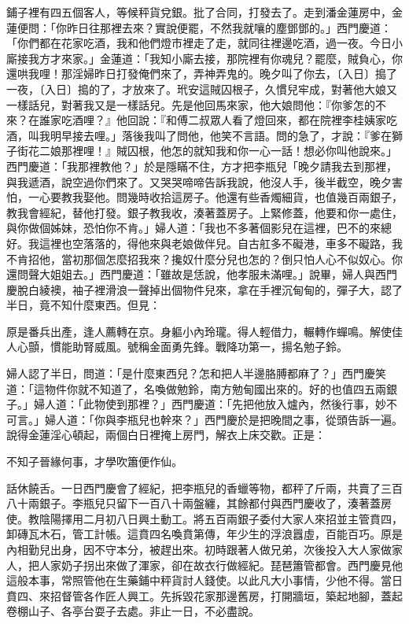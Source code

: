鋪子裡有四五個客人，等候秤貨兌銀。批了合同，打發去了。走到潘金蓮房中，金蓮便問：「你昨日往那裡去來？實說便罷，不然我就嚷的塵鄧鄧的。」西門慶道： 「你們都在花家吃酒，我和他們燈市裡走了走，就同往裡邊吃酒，過一夜。今日小廝接我方才來家。」金蓮道：「我知小廝去接，那院裡有你魂兒？罷麼，賊負心，你還哄我哩！那淫婦昨日打發俺們來了，弄神弄鬼的。晚夕叫了你去，〔入日〕搗了一夜，〔入日〕搗的了，才放來了。玳安這賊囚根子，久慣兒牢成，對著他大娘又一樣話兒，對著我又是一樣話兒。先是他回馬來家，他大娘問他：『你爹怎的不來？在誰家吃酒哩？』他回說：『和傅二叔眾人看了燈回來，都在院裡李桂姨家吃酒，叫我明早接去哩。」落後我叫了問他，他笑不言語。問的急了，才說：『爹在獅子街花二娘那裡哩！』賊囚根，他怎的就知我和你一心一話！想必你叫他說來。」西門慶道：「我那裡教他？」於是隱瞞不住，方才把李瓶兒「晚夕請我去到那裡，與我遞酒，說空過你們來了。又哭哭啼啼告訴我說，他沒人手，後半截空，晚夕害怕，一心要教我娶他。問幾時收拾這房子。他還有些香燭細貨，也值幾百兩銀子，教我會經紀，替他打發。銀子教我收，湊著蓋房子。上緊修蓋，他要和你一處住，與你做個姊妹，恐怕你不肯。」婦人道：「我也不多著個影兒在這裡，巴不的來總好。我這裡也空落落的，得他來與老娘做伴兒。自古舡多不礙港，車多不礙路，我不肯招他，當初那個怎麼招我來？攙奴什麼分兒也怎的？倒只怕人心不似奴心。你還問聲大姐姐去。」西門慶道：「雖故是恁說，他孝服未滿哩。」說畢，婦人與西門慶脫白綾襖，袖子裡滑浪一聲掉出個物件兒來，拿在手裡沉甸甸的，彈子大，認了半日，竟不知什麼東西。但見：

原是番兵出產，逢人薦轉在京。身軀小內玲瓏。得人輕借力，輾轉作蟬鳴。解使佳人心顫，慣能助腎威風。號稱金面勇先鋒。戰降功第一，揚名勉子鈴。

婦人認了半日，問道：「是什麼東西兒？怎和把人半邊胳膊都麻了？」西門慶笑道：「這物件你就不知道了，名喚做勉鈴，南方勉甸國出來的。好的也值四五兩銀子。」婦人道：「此物使到那裡？」西門慶道：「先把他放入爐內，然後行事，妙不可言。」婦人道：「你與李瓶兒也幹來？」西門慶於是把晚間之事，從頭告訴一遍。說得金蓮淫心頓起，兩個白日裡掩上房門，解衣上床交歡。正是：

不知子晉緣何事，才學吹簫便作仙。

話休饒舌。一日西門慶會了經紀，把李瓶兒的香蠟等物，都秤了斤兩，共賣了三百八十兩銀子。李瓶兒只留下一百八十兩盤纏，其餘都付與西門慶收了，湊著蓋房使。教陰陽擇用二月初八日興土動工。將五百兩銀子委付大家人來招並主管賁四，卸磚瓦木石，管工計帳。這賁四名喚賁第傳，年少生的浮浪囂虛，百能百巧。原是內相勤兒出身，因不守本分，被趕出來。初時跟著人做兄弟，次後投入大人家做家人，把人家奶子拐出來做了渾家，卻在故衣行做經紀。琵琶簫管都會。西門慶見他這般本事，常照管他在生藥鋪中秤貨討人錢使。以此凡大小事情，少他不得。當日賁四、來招督管各作匠人興工。先拆毀花家那邊舊房，打開牆垣，築起地腳，蓋起卷棚山子、各亭台耍子去處。非止一日，不必盡說。

